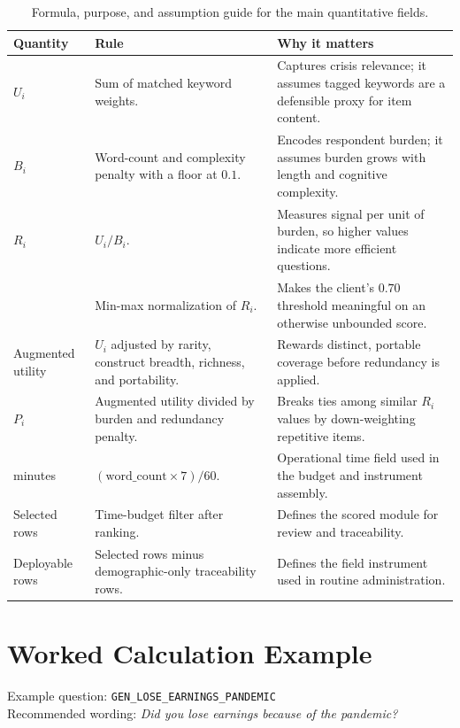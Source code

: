 \documentclass[12pt]{article}
\begin{document}
\begin{table}[H]
\centering
\footnotesize
\begin{tabularx}{\textwidth}{L{0.18\textwidth} Y Y}
\toprule
Quantity & Rule & Why it matters \\
\midrule
$U_i$ & Sum of matched keyword weights. & Captures crisis relevance; it assumes tagged keywords are a defensible proxy for item content. \\
$B_i$ & Word-count and complexity penalty with a floor at $0.1$. & Encodes respondent burden; it assumes burden grows with length and cognitive complexity. \\
$R_i$ & $U_i / B_i$. & Measures signal per unit of burden, so higher values indicate more efficient questions. \\
 & Min-max normalization of $R_i$. & Makes the client's $0.70$ threshold meaningful on an otherwise unbounded score. \\
Augmented utility & $U_i$ adjusted by rarity, construct breadth, richness, and portability. & Rewards distinct, portable coverage before redundancy is applied. \\
$P_i$ & Augmented utility divided by burden and redundancy penalty. & Breaks ties among similar $R_i$ values by down-weighting repetitive items. \\
minutes & $(\text{word\_count} \times 7)/60$. & Operational time field used in the budget and instrument assembly. \\
Selected rows & Time-budget filter after ranking. & Defines the scored module for review and traceability. \\
Deployable rows & Selected rows minus demographic-only traceability rows. & Defines the field instrument used in routine administration. \\
\bottomrule
\end{tabularx}
\caption{Formula, purpose, and assumption guide for the main quantitative fields.}
\end{table}

\section{Worked Calculation Example}

Example question: \texttt{GEN\_LOSE\_EARNINGS\_PANDEMIC}\\
Recommended wording: \emph{Did you lose earnings because of the pandemic?}
\end{document}
